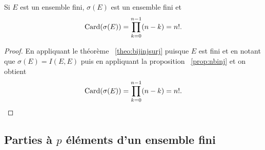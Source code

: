 \begin{prop}
  Si \(E\) est un ensemble fini, \(\sigma(E)\) est un ensemble fini et
  \begin{equation}
    \operatorname{Card}(\sigma(E))=\prod_{k=0}^{n-1}(n-k)=n!.
  \end{equation}
\end{prop}
\begin{proof}
  En appliquant le théorème~
\ref{theo:bijinjsurj} puisque \(E\) est fini et en notant que \(\sigma(E)=I(E,E)\) puis en appliquant la proposition~
\ref{prop:nbinj} et on obtient
  \begin{equation}
    \operatorname{Card}(\sigma(E))=\prod_{k=0}^{n-1}(n-k)=n!.
  \end{equation}
\end{proof}

\subsection{Parties à \(p\) éléments d'un ensemble fini}

